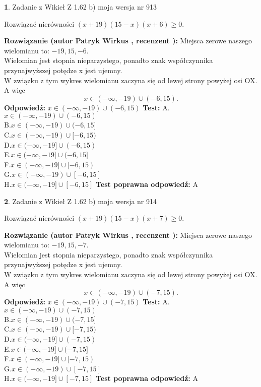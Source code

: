\documentclass[12pt, a4paper]{article}
\theoremstyle{definition} %
\newtheorem{zad}{}
\newcommand{\zadStart}[1]{\begin{zad}#1\newline}
\newcommand{\zadStop}{\end{zad}}
\newcommand{\rozwStart}[2]{\noindent \textbf{Rozwiązanie (autor #1 , recenzent #2): }\newline}
\newcommand{\rozwStop}{\newline}
\newcommand{\odpStart}{\noindent \textbf{Odpowiedź:}\newline}
\newcommand{\odpStop}{\newline}
\newcommand{\testStart}{\noindent \textbf{Test:}\newline}
\newcommand{\testStop}{\newline}
\newcommand{\kluczStart}{\noindent \textbf{Test poprawna odpowiedź:}\newline}
\newcommand{\kluczStop}{\newline}
\begin{document}
\zadStart{Zadanie z Wikieł Z 1.62 b) moja wersja nr 913}

Rozwiązać nierówności $(x+19)(15-x)(x+6)\ge0$.
\zadStop
\rozwStart{Patryk Wirkus}{}
Miejsca zerowe naszego wielomianu to: $-19, 15, -6$.\\
Wielomian jest stopnia nieparzystego, ponadto znak współczynnika przy\linebreak najwyższej potędze x jest ujemny.\\ W związku z tym wykres wielomianu zaczyna się od lewej strony powyżej osi OX. A więc $$x \in (-\infty,-19) \cup (-6,15).$$
\rozwStop
\odpStart
$x \in (-\infty,-19) \cup (-6,15)$
\odpStop
\testStart
A.$x \in (-\infty,-19) \cup (-6,15)$\\
B.$x \in (-\infty,-19) \cup (-6,15]$\\
C.$x \in (-\infty,-19) \cup [-6,15)$\\
D.$x \in (-\infty,-19] \cup (-6,15)$\\
E.$x \in (-\infty,-19] \cup (-6,15]$\\
F.$x \in (-\infty,-19] \cup [-6,15)$\\
G.$x \in (-\infty,-19) \cup [-6,15]$\\
H.$x \in (-\infty,-19] \cup [-6,15]$
\testStop
\kluczStart
A
\kluczStop



\zadStart{Zadanie z Wikieł Z 1.62 b) moja wersja nr 914}

Rozwiązać nierówności $(x+19)(15-x)(x+7)\ge0$.
\zadStop
\rozwStart{Patryk Wirkus}{}
Miejsca zerowe naszego wielomianu to: $-19, 15, -7$.\\
Wielomian jest stopnia nieparzystego, ponadto znak współczynnika przy\linebreak najwyższej potędze x jest ujemny.\\ W związku z tym wykres wielomianu zaczyna się od lewej strony powyżej osi OX. A więc $$x \in (-\infty,-19) \cup (-7,15).$$
\rozwStop
\odpStart
$x \in (-\infty,-19) \cup (-7,15)$
\odpStop
\testStart
A.$x \in (-\infty,-19) \cup (-7,15)$\\
B.$x \in (-\infty,-19) \cup (-7,15]$\\
C.$x \in (-\infty,-19) \cup [-7,15)$\\
D.$x \in (-\infty,-19] \cup (-7,15)$\\
E.$x \in (-\infty,-19] \cup (-7,15]$\\
F.$x \in (-\infty,-19] \cup [-7,15)$\\
G.$x \in (-\infty,-19) \cup [-7,15]$\\
H.$x \in (-\infty,-19] \cup [-7,15]$
\testStop
\kluczStart
A
\kluczStop
\end{document}
